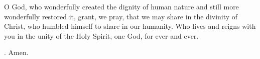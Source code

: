 \lettrine[lines=3]{O}{} God, who wonderfully created the dignity of human nature
and still more wonderfully restored it,
grant, we pray,
that we may share in the divinity of Christ,
who humbled himself to share in our humanity.
Who lives and reigns with you in the unity of the Holy Spirit,
one God, for ever and ever. \par \Rbar. Amen.
